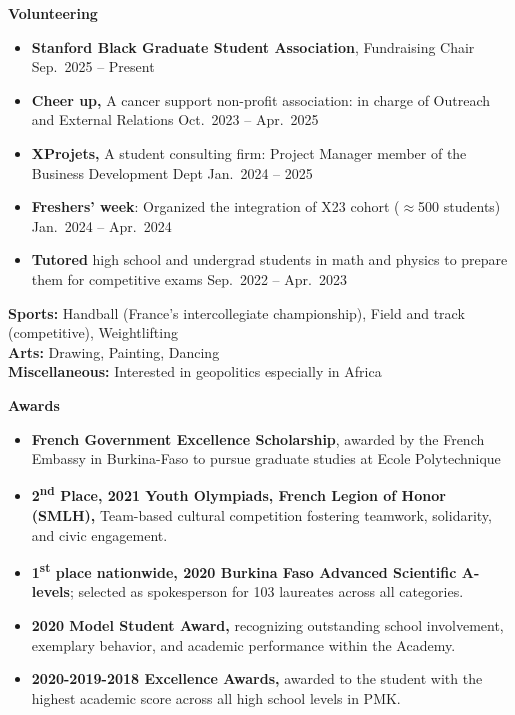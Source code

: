 \documentclass[10pt,letterpaper]{article}
\begin{document}
\noindent\textbf{Volunteering}
\begin{itemize}
  \item \textbf{Stanford Black Graduate Student Association}, Fundraising Chair \hfill Sep.\ 2025 -- Present
  \item \textbf{Cheer up,} A cancer support non-profit association: in charge of Outreach and External Relations \hfill Oct.\ 2023 -- Apr.\ 2025
  \item \textbf{XProjets,} A student consulting firm: Project Manager member of the Business Development Dept \hfill Jan.\ 2024 -- 2025
  \item \textbf{Freshers' week}: Organized the integration of X23 cohort ($\approx$500 students) \hfill Jan.\ 2024 -- Apr.\ 2024
  \item \textbf{Tutored} high school and undergrad students in math and physics to prepare them for competitive exams \hfill Sep.\ 2022 -- Apr.\ 2023
\end{itemize}

\noindent\textbf{Sports:} Handball (France's intercollegiate championship), Field and track (competitive), Weightlifting\\
\textbf{Arts:} Drawing, Painting, Dancing\\
\textbf{Miscellaneous:} Interested in geopolitics especially in Africa

\noindent\textbf{Awards}
\begin{itemize}
  \item \textbf{French Government Excellence Scholarship}, awarded by the French Embassy in Burkina-Faso to pursue graduate studies at Ecole Polytechnique
  \item \textbf{2\textsuperscript{nd} Place, 2021 Youth Olympiads, French Legion of Honor (SMLH),} Team-based cultural competition fostering teamwork, solidarity, and civic engagement.
  \item \textbf{1\textsuperscript{st} place nationwide, 2020 Burkina Faso Advanced Scientific A-levels}; selected as spokesperson for 103 laureates across all categories.
  \item \textbf{2020 Model Student Award,} recognizing outstanding school involvement, exemplary behavior, and academic performance within the Academy.
  \item \textbf{2020-2019-2018 Excellence Awards,} awarded to the student with the highest academic score across all high school levels in PMK.
\end{itemize}
\end{document}

